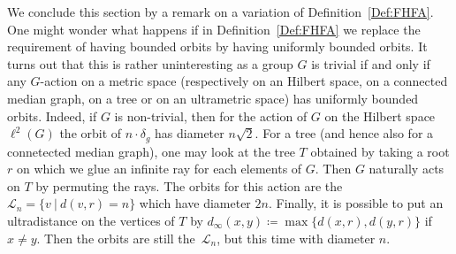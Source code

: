 \documentclass[a4paper]{article}
\theoremstyle{definition}
\newcommand{\setst}[2]{\{#1\ |\ #2\}}
\begin{document}
We conclude this section by a remark on a variation of Definition~\ref{Def:FHFA}.
One might wonder what happens if in Definition~\ref{Def:FHFA} we replace the requirement of having bounded orbits by having uniformly bounded orbits.
It turns out that this is rather uninteresting as a group $G$ is trivial if and only if any $G$-action on a metric space (respectively on an Hilbert space, on a connected median graph, on a tree or on an ultrametric space) has uniformly bounded orbits.
Indeed, if $G$ is non-trivial, then for the action of $G$ on the Hilbert space $\ell^2(G)$ the orbit of $n\cdot \delta_g$ has diameter $n\sqrt2$.
For a tree (and hence also for a connetected median graph), one may look at the tree $T$ obtained by taking a root $r$ on which we glue an infinite ray for each elements of $G$. Then $G$ naturally acts on $T$ by permuting the rays. The orbits for this action are the $\mathcal L_n=\setst{v}{d(v,r)=n}$ which have diameter $2n$.
Finally, it is possible to put an ultradistance on the vertices of $T$ by  $d_\infty(x,y)\coloneqq\max\{d(x,r),d(y,r)\}$ if $x\neq y$. Then the orbits are still the~$\mathcal L_n$, but this time with diameter $n$.
%
%
%
%
%
%
%
%
%
%
\end{document}
